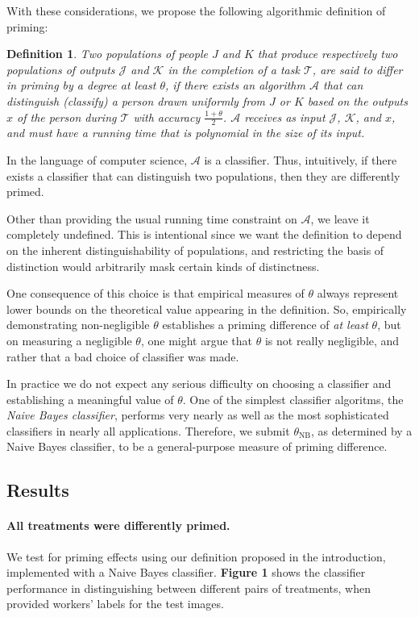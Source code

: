 \documentclass[a4paper]{report}
\newtheorem*{mydef}{Definition}
\begin{document}
With these considerations, we propose the following algorithmic definition of
priming:

\begin{mydef}
	Two populations of people $J$ and $K$ that produce respectively two 
	populations of outputs $\mathcal{J}$ and $\mathcal{K}$ in the completion
	of a task $\mathcal{T}$, are said to \emph{differ in priming by 
	a degree at least $\theta$}, if there exists an algorithm $\mathcal{A}$ 
	that can distinguish (classify)
	a person drawn uniformly from $J$ or $K$ based on the outputs $x$ of the 
	person during $\mathcal{T}$ with accuracy $\frac{1+\theta}{2}$.
	$\mathcal{A}$ receives as input $\mathcal{J}$, $\mathcal{K}$, and $x$,
	and must have a running time that is polynomial in the size of its input.
\end{mydef}

In the language of computer science, $\mathcal{A}$ is a classifier.  Thus,
intuitively, if there exists a classifier that can distinguish two populations,
then they are differently primed.

Other than providing the usual running time constraint on $\mathcal{A}$, we
leave it completely undefined.  This is intentional since we want the 
definition to depend on the inherent distinguishability of populations, and
restricting the basis of distinction would arbitrarily mask certain kinds of
distinctness.

One consequence of this choice is that empirical measures of $\theta$ always
represent lower bounds on the theoretical value appearing in the definition.
So, empirically demonstrating non-negligible $\theta$ establishes a priming 
difference of \textit{at least} $\theta$, but on measuring a negligible 
$\theta$, one might argue that $\theta$ is not really negligible, and rather 
that a bad choice of classifier was made.

In practice we do not expect any serious difficulty on choosing a classifier
and establishing a meaningful value of $\theta$.  One of the simplest 
classifier algoritms, the \textit{Naive Bayes classifier}, performs very 
nearly as well as the most sophisticated classifiers in nearly all 
applications.  Therefore, we submit $\theta_\text{NB}$, as determined by a 
Naive Bayes classifier, to be a general-purpose measure of priming difference.

\subsection*{Results}
\paragraph{All treatments were differently primed.}
We test for priming effects using our definition proposed in the introduction,
implemented with a Naive Bayes classifier.  \textbf{Figure 1} shows
the classifier performance in distinguishing between different pairs of 
treatments, when provided workers' labels for the test images.
\end{document}
